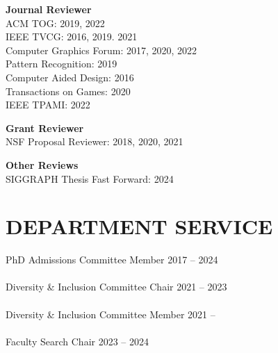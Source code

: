 \documentclass[line,margin]{res}
\begin{document}
\begin{resume}
\textbf{Journal Reviewer}\\
ACM TOG: 2019, 2022\\
IEEE TVCG: 2016, 2019. 2021\\
Computer Graphics Forum: 2017, 2020, 2022\\
Pattern Recognition: 2019\\
Computer Aided Design: 2016\\
Transactions on Games: 2020\\
IEEE TPAMI: 2022

\textbf{Grant Reviewer}\\
NSF Proposal Reviewer: 2018, 2020, 2021

\textbf{Other Reviews}\\
SIGGRAPH Thesis Fast Forward: 2024


\section{DEPARTMENT SERVICE}

PhD Admissions Committee Member \hfill 2017 -- 2024
\\ \\
Diversity \& Inclusion Committee Chair \hfill 2021 -- 2023
\\ \\
Diversity \& Inclusion Committee Member \hfill 2021 -- 
\\ \\
Faculty Search Chair \hfill 2023 -- 2024








\end{resume}
\end{document}
